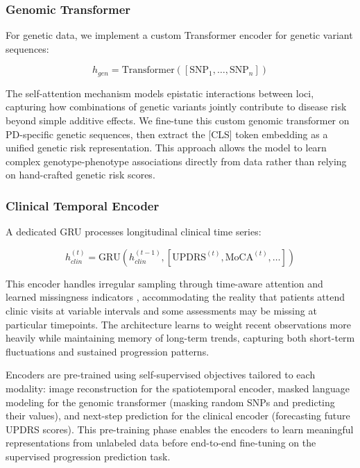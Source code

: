\documentclass[conference]{IEEEtran}
\begin{document}
\subsubsection{Genomic Transformer}
For genetic data, we implement a custom Transformer encoder for genetic variant sequences:

\begin{equation}
h_{gen} = \text{Transformer}([\text{SNP}_1, \ldots, \text{SNP}_n])
\end{equation}

The self-attention mechanism models epistatic interactions between loci, capturing how combinations of genetic variants jointly contribute to disease risk beyond simple additive effects. We fine-tune this custom genomic transformer on PD-specific genetic sequences, then extract the [CLS] token embedding as a unified genetic risk representation. This approach allows the model to learn complex genotype-phenotype associations directly from data rather than relying on hand-crafted genetic risk scores.

\subsubsection{Clinical Temporal Encoder}
A dedicated GRU processes longitudinal clinical time series:

\begin{equation}
h_{clin}^{(t)} = \text{GRU}(h_{clin}^{(t-1)}, [\text{UPDRS}^{(t)}, \text{MoCA}^{(t)}, \ldots])
\end{equation}

This encoder handles irregular sampling through time-aware attention and learned missingness indicators \cite{che2018recurrent}, accommodating the reality that patients attend clinic visits at variable intervals and some assessments may be missing at particular timepoints. The architecture learns to weight recent observations more heavily while maintaining memory of long-term trends, capturing both short-term fluctuations and sustained progression patterns.

Encoders are pre-trained using self-supervised objectives tailored to each modality: image reconstruction for the spatiotemporal encoder, masked language modeling for the genomic transformer (masking random SNPs and predicting their values), and next-step prediction for the clinical encoder (forecasting future UPDRS scores). This pre-training phase enables the encoders to learn meaningful representations from unlabeled data before end-to-end fine-tuning on the supervised progression prediction task.
\end{document}
